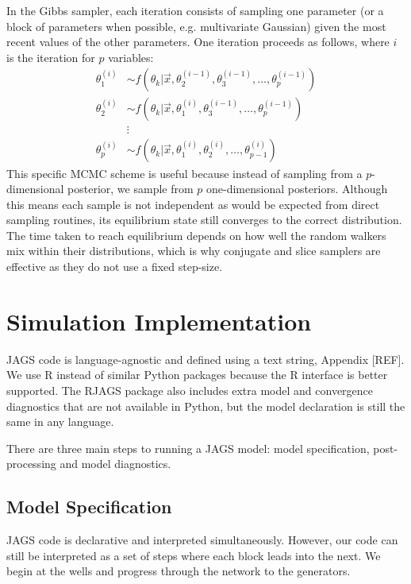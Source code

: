 \documentclass[a4paper, 12pt]{article}
\begin{document}
In the Gibbs sampler, each iteration consists of sampling one parameter (or a block of parameters when possible, e.g. multivariate Gaussian) given the most recent values of the other parameters. One iteration proceeds as follows, where $i$ is the iteration for $p$ variables:
\begin{align}
\theta_1^{(i)} &\sim f\left( \theta_k|\vec{x}, \theta_2^{(i-1)}, \theta_3^{(i-1)},\dots, \theta_p^{(i-1)} \right)\\
\theta_2^{(i)} &\sim f\left( \theta_k|\vec{x}, \theta_1^{(i)}, \theta_3^{(i-1)},\dots, \theta_p^{(i-1)} \right)\\
&\vdots\\
\theta_p^{(i)} &\sim f\left( \theta_k|\vec{x}, \theta_1^{(i)}, \theta_2^{(i)},\dots, \theta_{p-1}^{(i)} \right)
\end{align}
This specific MCMC scheme is useful because instead of sampling from a $p$-dimensional posterior, we sample from $p$ one-dimensional posteriors. Although this means each sample is not independent as would be expected from direct sampling routines, its equilibrium state still converges to the correct distribution. The time taken to reach equilibrium depends on how well the random walkers mix within their distributions, which is why conjugate and slice samplers are effective as they do not use a fixed step-size.


\section{Simulation Implementation}
JAGS code is language-agnostic and defined using a text string, Appendix [REF]. We use R instead of similar Python packages because the R interface is better supported. The RJAGS package also includes extra model and convergence diagnostics that are not available in Python, but the model declaration is still the same in any language.

There are three main steps to running a JAGS model: model specification, post-processing and model diagnostics.

\subsection{Model Specification}
JAGS code is declarative and interpreted simultaneously. However, our code can still be interpreted as a set of steps where each block leads into the next. We begin at the wells and progress through the network to the generators.
\end{document}
